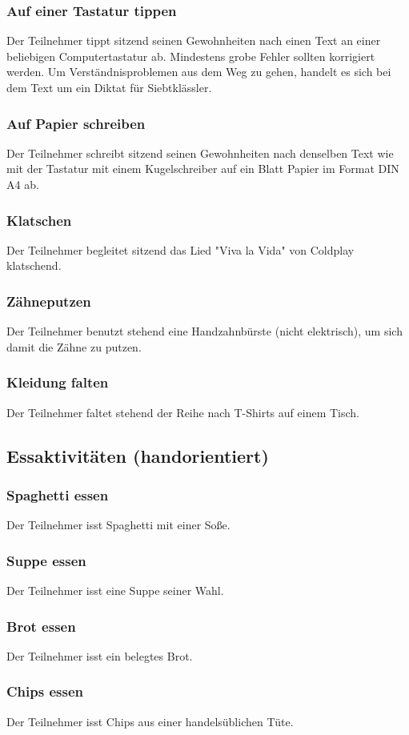 \subsubsection{Auf einer Tastatur tippen}
Der Teilnehmer tippt sitzend seinen Gewohnheiten nach einen Text an einer beliebigen Computertastatur ab. Mindestens grobe Fehler sollten korrigiert werden. Um Verständnisproblemen aus dem Weg zu gehen, handelt es sich bei dem Text um ein Diktat für Siebtklässler.
\subsubsection{Auf Papier schreiben}
Der Teilnehmer schreibt sitzend seinen Gewohnheiten nach denselben Text wie mit der Tastatur mit einem Kugelschreiber auf ein Blatt Papier im Format DIN A4 ab.
\subsubsection{Klatschen}
Der Teilnehmer begleitet sitzend das Lied "Viva la Vida" von Coldplay klatschend.
\subsubsection{Zähneputzen}
Der Teilnehmer benutzt stehend eine Handzahnbürste (nicht elektrisch), um sich damit die Zähne zu putzen.
\subsubsection{Kleidung falten}
Der Teilnehmer faltet stehend der Reihe nach T-Shirts auf einem Tisch.

\subsection{Essaktivitäten (handorientiert)}
\subsubsection{Spaghetti essen}
Der Teilnehmer isst Spaghetti mit einer Soße.
\subsubsection{Suppe essen}
Der Teilnehmer isst eine Suppe seiner Wahl.
\subsubsection{Brot essen}
Der Teilnehmer isst ein belegtes Brot.
\subsubsection{Chips essen}
Der Teilnehmer isst Chips aus einer handelsüblichen Tüte.
